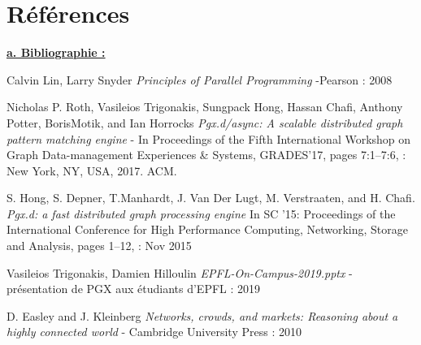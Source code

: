 \chapter*{Références}
\textbf{\underline{a. Bibliographie :}} 
\begin{enumerate}[label={[\arabic*]}]

\item Calvin Lin, Larry Snyder \textit{Principles of Parallel Programming} -Pearson : 2008
\item Nicholas P. Roth, Vasileios Trigonakis, Sungpack Hong, Hassan Chafi, Anthony Potter, BorisMotik, and Ian Horrocks \textit{Pgx.d/async: A scalable distributed graph pattern matching engine} - In Proceedings of the Fifth International Workshop on Graph Data-management Experiences \& Systems, GRADES’17, pages 7:1–7:6, : New York, NY, USA, 2017. ACM.
\item S. Hong, S. Depner, T.Manhardt, J. Van Der Lugt, M. Verstraaten, and H. Chafi. \textit{Pgx.d: a fast distributed graph processing engine } In SC ’15: Proceedings of the International Conference for High Performance Computing, Networking, Storage and Analysis, pages 1–12, : Nov 2015
\item Vasileios Trigonakis, Damien Hilloulin \textit{EPFL-On-Campus-2019.pptx} - présentation de PGX aux étudiants d’EPFL : 2019
\item D. Easley and J. Kleinberg \textit{Networks, crowds, and markets: Reasoning about a highly connected world} - Cambridge University Press : 2010
\end{enumerate}\\


